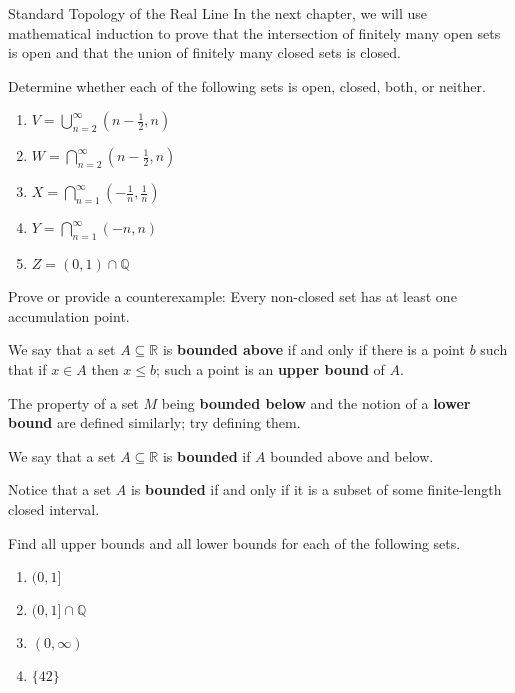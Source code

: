 \begin{section}{Standard Topology of the Real Line}
In the next chapter, we will use mathematical induction to prove that the intersection of finitely many open sets is open and that the union of finitely many closed sets is closed.

\begin{problem}
Determine whether each of the following sets is open, closed, both, or neither.
\begin{enumerate}[label=\textrm{(\alph*)}]
\item $\displaystyle V=\bigcup_{n=2}^{\infty} \left(n - \frac{1}{2},n\right)$
\item $\displaystyle W=\bigcap_{n=2}^{\infty} \left(n - \frac{1}{2},n\right)$
\item $\displaystyle X=\bigcap_{n=1}^{\infty} \left(-\frac{1}{n}, \frac{1}{n}\right)$
\item $\displaystyle Y=\bigcap_{n=1}^{\infty} \left(-n, n\right)$
\item $Z=(0,1)\cap \mathbb{Q}$
\end{enumerate}
\end{problem}

\begin{problem}
Prove or provide a counterexample: Every non-closed set has at least one accumulation point.
\end{problem}


\begin{definition}
We say that a set $A\subseteq \mathbb{R}$ is \textbf{bounded above} if and only if there is a point $b$ such that if $x\in A$ then $x\leq b$; such a point is an \textbf{upper bound} of $A$.
\end{definition}

\begin{problem}
The property of a set $M$ being \textbf{bounded below} and the notion of a \textbf{lower bound} are defined similarly; try defining them.
\end{problem}

\begin{definition}
We say that a set $A\subseteq \mathbb{R}$ is \textbf{bounded} if $A$ bounded above and below.
\end{definition}

Notice that a set $A$ is \textbf{bounded} if and only if it is a subset of some finite-length closed interval.

\begin{problem}\label{prob:find upper bounds}
Find all upper bounds and all lower bounds for each of the following sets.
\begin{enumerate}[label=\textrm{(\alph*)}]
\item $(0,1]$
\item $(0,1]\cap \mathbb{Q}$
\item $(0,\infty)$
\item $\{42\}$
\end{enumerate}
\end{problem}


\end{section}
